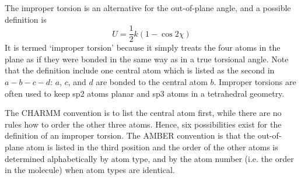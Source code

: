 The improper torsion is an alternative for the out-of-plane angle, and a possible definition is
\begin{equation}
  U=\frac{1}{2} k \left(1-\cos 2\chi\right)
\end{equation}
It is termed `improper torsion' because it simply treats the four atoms in the plane as if they were
bonded in the same way as in a true torsional angle. Note that the definition include one central atom
which is listed as the second in $a-b-c-d$: $a$, $c$, and $d$ are bonded to the central atom $b$.
Improper torsions are often used to keep sp2 atoms planar and sp3 atoms in a tetrahedral geometry.

The CHARMM convention is to list the central atom first, while there are no rules how to order the other three atoms.
Hence, six possibilities exist for the definition of an improper torsion. The AMBER convention is that the out-of-plane
atom is listed in the third position and the order of the other atoms is determined alphabetically by atom type, and
by the atom number (i.e. the order in the molecule) when atom types are identical.


